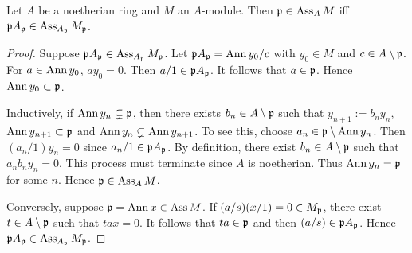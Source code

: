         \begin{lemma}\label{lem: associated set is stable under localization}
            Let $A$ be a noetherian ring and $M$ an $A$-module.
            Then ${\mathfrak{p}} \in \operatorname{Ass}_A M$ iff ${\mathfrak{p}} A_{\mathfrak{p}} \in \operatorname{Ass}_{A_{\mathfrak{p}}} M_{\mathfrak{p}}$.
        \end{lemma}
        \begin{proof}
            Suppose ${\mathfrak{p}} A_{\mathfrak{p}}\in \operatorname{Ass}_{A_{\mathfrak{p}}} M_{\mathfrak{p}}$.
            Let ${\mathfrak{p}} A_{\mathfrak{p}} = \operatorname{Ann} y_0/c$ with $y_0 \in M$ and $c \in A \setminus {\mathfrak{p}}$.
            For $a \in \operatorname{Ann} y_0$, $ay_0 = 0$.
            Then $a/1 \in {\mathfrak{p}} A_{\mathfrak{p}}$.
            It follows that $a \in {\mathfrak{p}}$.
            Hence $\operatorname{Ann} y_0 \subset {\mathfrak{p}}$.

            Inductively, if $\operatorname{Ann} y_n \subsetneq {\mathfrak{p}}$, then there exists $b_{n} \in A \setminus {\mathfrak{p}}$ 
            such that $y_{n+1}:=b_ny_n$, $\operatorname{Ann} y_{n+1} \subset {\mathfrak{p}}$ and $\operatorname{Ann} y_n \subsetneq \operatorname{Ann} y_{n+1}$.
            To see this, choose $a_n \in {\mathfrak{p}}\setminus \operatorname{Ann} y_n$.
            Then $(a_n/1) y_n = 0$ since $a_n/1 \in {\mathfrak{p}} A_{\mathfrak{p}}$.
            By definition, there exist $b_n \in A \setminus {\mathfrak{p}}$ such that $a_nb_ny_n = 0$.
            This process must terminate since $A$ is noetherian.
            Thus $\operatorname{Ann} y_n = {\mathfrak{p}}$ for some $n$.
            Hence ${\mathfrak{p}} \in \operatorname{Ass}_A M$. 

            Conversely, suppose ${\mathfrak{p}} = \operatorname{Ann} x \in \operatorname{Ass} M$.
            If $(a/s)(x/1) = 0 \in M_{\mathfrak{p}}$, there exist $t \in A \setminus {\mathfrak{p}}$ such that $tax = 0$.
            It follows that $ta \in {\mathfrak{p}}$ and then $(a/s) \in {\mathfrak{p}} A_{\mathfrak{p}}$.
            Hence ${\mathfrak{p}} A_{\mathfrak{p}} \in \operatorname{Ass}_{A_{\mathfrak{p}}} M_{\mathfrak{p}}$.
        \end{proof}

